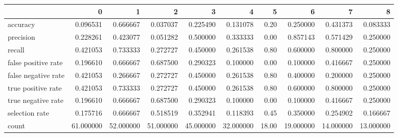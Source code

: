 \begin{tabular}{lrrrrrrrrr}
\toprule
{} &          0 &          1 &          2 &          3 &          4 &      5 &          6 &          7 &          8 \\
\midrule
accuracy            &   0.096531 &   0.666667 &   0.037037 &   0.225490 &   0.131078 &   0.20 &   0.250000 &   0.431373 &   0.083333 \\
precision           &   0.228261 &   0.423077 &   0.051282 &   0.500000 &   0.333333 &   0.00 &   0.857143 &   0.571429 &   0.250000 \\
recall              &   0.421053 &   0.733333 &   0.272727 &   0.450000 &   0.261538 &   0.80 &   0.600000 &   0.800000 &   0.250000 \\
false positive rate &   0.196610 &   0.666667 &   0.687500 &   0.290323 &   0.100000 &   0.00 &   0.100000 &   0.416667 &   0.250000 \\
false negative rate &   0.421053 &   0.266667 &   0.272727 &   0.450000 &   0.261538 &   0.80 &   0.400000 &   0.200000 &   0.250000 \\
true positive rate  &   0.421053 &   0.733333 &   0.272727 &   0.450000 &   0.261538 &   0.80 &   0.600000 &   0.800000 &   0.250000 \\
true negative rate  &   0.196610 &   0.666667 &   0.687500 &   0.290323 &   0.100000 &   0.00 &   0.100000 &   0.416667 &   0.250000 \\
selection rate      &   0.175716 &   0.666667 &   0.518519 &   0.352941 &   0.118393 &   0.45 &   0.350000 &   0.254902 &   0.166667 \\
count               &  61.000000 &  52.000000 &  51.000000 &  45.000000 &  32.000000 &  18.00 &  19.000000 &  14.000000 &  13.000000 \\
\bottomrule
\end{tabular}
